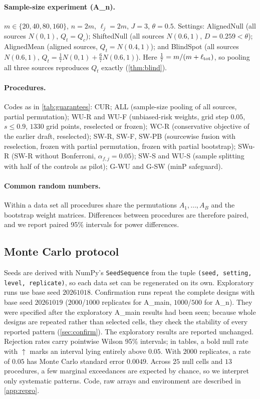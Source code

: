 \paragraph{Sample-size experiment (A\_n).} $m\in\{20,40,80,160\}$, $n=2m$, $\ell_j=2m$, $J=3$, $\theta=0.5$. Settings: AlignedNull (all sources $N(0,1)$, $Q_t=Q_c$); ShiftedNull (all sources $N(0.6,1)$, $D=0.259<\theta$); AlignedMean (aligned sources, $Q_t=N(0.4,1)$); and BlindSpot (all sources $N(0.6,1)$, $Q_t=\frac17N(0,1)+\frac67N(0.6,1)$). Here $\frac17=m/(m+\ell_{\rm tot})$, so pooling all three sources reproduces $Q_t$ exactly (\cref{thm:blind}).

\paragraph{Procedures.} Codes as in \cref{tab:guarantees}: CUR; ALL (sample-size pooling of all sources, partial permutation); WU-R and WU-F (unbiased-risk weights, grid step $0.05$, $s\le0.9$, $1330$ grid points, reselected or frozen); WC-R (conservative objective of the earlier draft, reselected); SW-R, SW-F, SW-PB (sourcewise fusion with reselection, frozen with partial permutation, frozen with partial bootstrap); SWu-R (SW-R without Bonferroni, $\alpha_{f,j}=0.05$); SW-S and WU-S (sample splitting with half of the controls as pilot); G-WU and G-SW (minP safeguard).

\paragraph{Common random numbers.} Within a data set all procedures share the permutations $A_1,\dots,A_B$ and the bootstrap weight matrices. Differences between procedures are therefore paired, and we report paired 95\% intervals for power differences.

\subsection{Monte Carlo protocol}\label{sec:protocol}

Seeds are derived with NumPy's \texttt{SeedSequence} from the tuple \texttt{(seed, setting, level, replicate)}, so each data set can be regenerated on its own. Exploratory runs use base seed $20261018$. Confirmation runs repeat the complete designs with base seed $20261019$ ($2000$/$1000$ replicates for A\_main, $1000$/$500$ for A\_n). They were specified after the exploratory A\_main results had been seen; because whole designs are repeated rather than selected cells, they check the stability of every reported pattern (\cref{sec:confirm}). The exploratory results are reported unchanged. Rejection rates carry pointwise Wilson 95\% intervals; in tables, a bold null rate with $\uparrow$ marks an interval lying entirely above $0.05$. With $2000$ replicates, a rate of $0.05$ has Monte Carlo standard error $0.0049$. Across $25$ null cells and $13$ procedures, a few marginal exceedances are expected by chance, so we interpret only systematic patterns. Code, raw arrays and environment are described in \cref{app:repro}.
